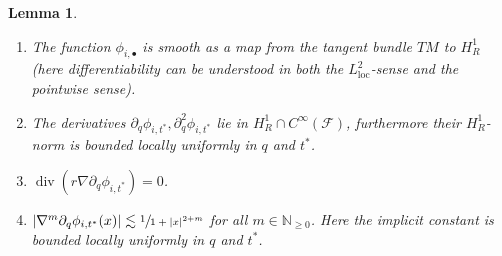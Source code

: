 \documentclass[10pt]{amsart}
\newcommand{\skpt}{\par\smallskip\noindent}
\newcommand{\loc}{\mathrm{loc}}
\newcommand{\sbullet}{{\scriptscriptstyle\bullet}}
\newtheorem{lemma}[theorem]{Lemma}
\theoremstyle{definition}
\renewcommand{\div}{\operatorname{div}}
\newcommand\N{\mathbb{N}}
\let\de\partial
\begin{document}
\skpt
\begin{lemma}\label{SmoothnessInq}
\begin{enumerate}
\item\label{SmoothnessInqa} The function $\phi_{i,\sbullet}$ is smooth as a map from the tangent bundle $TM$ to $H_R^1$ (here differentiability can be understood in both the $L_{\loc}^2$-sense and the pointwise sense).
\item\label{SmoothnessInqb} The derivatives $\de_q \phi_{i,t^*},\de_q^2\phi_{i,t^*}$ lie in $H_R^1\cap C^\infty(\mathcal{F})$, furthermore their $H_{R}^1$-norm is bounded locally uniformly in $q$ and $t^*$.
\item\label{SmoothnessInqc} $\div(r\nabla\de_q \phi_{i,t^*})=0$.
\item\label{SmoothnessInqd}
$|\nabla^m\de_q\phi_{i,t^*}(x)|\lesssim \sfrac{1}{1+|x|^{2+m}}$ for all $m\in\N_{\geq 0}$.
Here the implicit constant is bounded locally uniformly in $q$ and $t^*$.
\end{enumerate}
\end{lemma}
\end{document}
